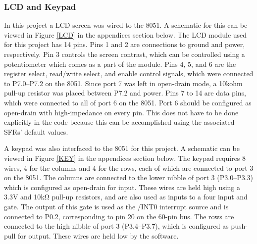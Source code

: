 \documentclass[12pt]{article}
\begin{document}
\subsubsection{LCD and Keypad}
In this project a LCD screen was wired to the 8051. A schematic for this can be viewed in Figure \ref{LCD} in the appendices section below. The LCD module used for this project has 14 pins.
Pins 1 and 2 are connections to ground and power, respectively. Pin 3 controls the screen contrast, which can be controlled using a potentiometer which comes as a part of the module. Pins 4, 5, and 6 are the register select, read/write select, and enable control signals, which were connected to P7.0--P7.2 on the 8051. Since port 7 was left in open-drain mode, a 10k\si{ohm} pull-up resistor was placed between P7.2 and power. Pins 7 to 14 are data pins, which were connected to all of port 6 on the 8051. Port 6 should be configured as open-drain with high-impedance on every pin. This does not have to be done explicitly in the code because this can be accomplished using the associated SFRs' default values.

A keypad was also interfaced to the 8051 for this project. A schematic can be viewed in Figure \ref{KEY} in the appendices section below. The keypad requires 8 wires, 4 for the columns and 4 for the rows, each of which are connected to port 3 on the 8051. The columns are connected to the lower nibble of port 3 (P3.0--P3.3) which is configured as open-drain for input. These wires are held high using a 3.3\si{V} and 10k\si{\ohm} pull-up resistors, and are also used as inputs to a four input and gate. The output of this gate is used as the /INT0 interrupt source and is connected to P0.2, corresponding to pin 20 on the 60-pin bus. The rows are connected to the high nibble of port 3 (P3.4--P3.7), which is configured as push-pull for output. These wires are held low by the software. 
\end{document}
